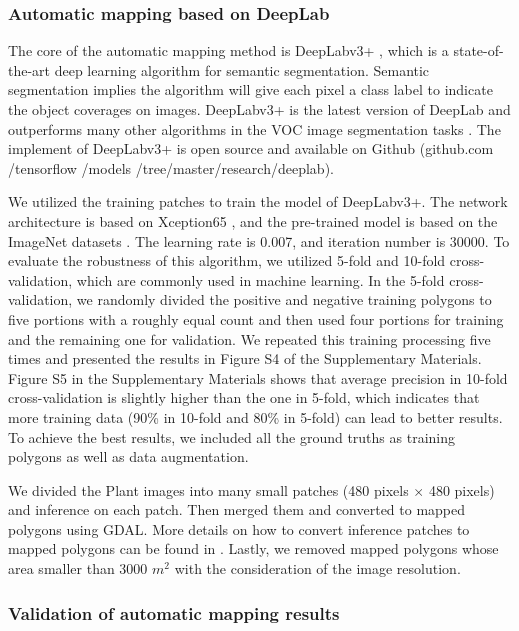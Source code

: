 \documentclass[preprint,12pt,authoryear]{elsarticle}
\begin{document}
\subsubsection{Automatic mapping based on DeepLab}
\label{subsubsec_deeplab}

The core of the automatic mapping method is DeepLabv3+ \citep{chen_encoder-decoder_2018} , which is a state-of-the-art deep learning algorithm for semantic segmentation. Semantic segmentation implies the algorithm will give each pixel a class label to indicate the object coverages on images. DeepLabv3+ is the latest version of DeepLab and outperforms many other algorithms in the VOC image segmentation tasks \citep{everingham_pascal_2015}. The implement of DeepLabv3+ is open source and available on Github (github.com /tensorflow /models /tree/master/research/deeplab).

We utilized the training patches to train the model of DeepLabv3+. The network architecture is based on Xception65 \citep{chollet2017xception}, and the pre-trained model is based on the ImageNet datasets \citep{russakovsky2015imagenet}. The learning rate is 0.007, and iteration number is 30000. To evaluate the robustness of this algorithm, we utilized 5-fold and 10-fold cross-validation, which are commonly used in machine learning. In the 5-fold cross-validation, we randomly divided the positive and negative training polygons to five portions with a roughly equal count and then used four portions for training and the remaining one for validation. We repeated this training processing five times and presented the results in Figure S4 of the Supplementary Materials. Figure S5 in the Supplementary Materials shows that average precision in 10-fold cross-validation is slightly higher than the one in 5-fold, which indicates that more training data (90\% in 10-fold and 80\% in 5-fold) can lead to better results. To achieve the best results, we included all the ground truths as training polygons as well as data augmentation. 

We divided the Plant images into many small patches (480 pixels $\times$  480 pixels) and inference on each patch. Then merged them and converted to mapped polygons using GDAL. More details on how to convert inference patches to mapped polygons can be found in \cite{huang2018automatic}. Lastly, we removed mapped polygons whose area smaller than 3000 $m^2$ with the consideration of the image resolution.  

\subsubsection{Validation of automatic mapping results}
\label{subsubsec_validation}
\end{document}

